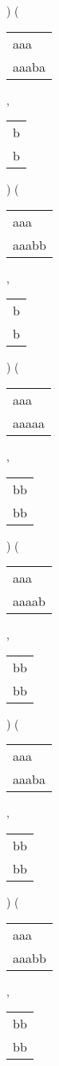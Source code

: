 ) 
 ( 
\begin{tabular}{|l|} \hline
aaa\ \  \\
aaaba \\
\hline
\end{tabular} 
 , 
\begin{tabular}{|l|} \hline
b \\
b \\
\hline
\end{tabular} 
) 
 ( 
\begin{tabular}{|l|} \hline
aaa\ \  \\
aaabb \\
\hline
\end{tabular} 
 , 
\begin{tabular}{|l|} \hline
b \\
b \\
\hline
\end{tabular} 
) 
 ( 
\begin{tabular}{|l|} \hline
aaa\ \  \\
aaaaa \\
\hline
\end{tabular} 
 , 
\begin{tabular}{|l|} \hline
bb \\
bb \\
\hline
\end{tabular} 
) 
 ( 
\begin{tabular}{|l|} \hline
aaa\ \  \\
aaaab \\
\hline
\end{tabular} 
 , 
\begin{tabular}{|l|} \hline
bb \\
bb \\
\hline
\end{tabular} 
) 
 ( 
\begin{tabular}{|l|} \hline
aaa\ \  \\
aaaba \\
\hline
\end{tabular} 
 , 
\begin{tabular}{|l|} \hline
bb \\
bb \\
\hline
\end{tabular} 
) 
 ( 
\begin{tabular}{|l|} \hline
aaa\ \  \\
aaabb \\
\hline
\end{tabular} 
 , 
\begin{tabular}{|l|} \hline
bb \\
bb \\
\hline
\end{tabular} 
